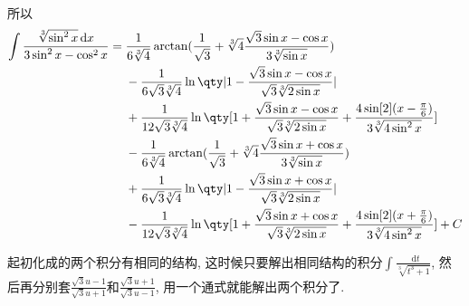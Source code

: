 \documentclass{ctexbook}
\newcommand*{\dif}{\mathop{}\!\mathrm{d}}
\begin{document}
{\begin{align*}
\end{align*} 
所以
\begin{align*}
\int\frac{\sqrt[3]{\sin^{2}{x}}\dif{x}}{3\sin^{2}{x}-\cos^{2}{x}}={}&\frac{1}{6\sqrt[3]{4}}\arctan(\frac{1}{\sqrt{3}}+\sqrt[3]{4}\frac{\sqrt{3}\sin{x}-\cos{x}}{3\sqrt[3]{\sin{x}}})\\
{}&-\frac{1}{6\sqrt{3}\sqrt[3]{4}}\ln\qty|1-\frac{\sqrt{3}\sin{x}-\cos{x}}{\sqrt{3}\sqrt[3]{2\sin{x}}}|\\
{}&+\frac{1}{12\sqrt{3}\sqrt[3]{4}}\ln\qty[1+\frac{\sqrt{3}\sin{x}-\cos{x}}{\sqrt{3}\sqrt[3]{2\sin{x}}}+\frac{4\sin[2](x-\frac{\pi}{6})}{3\sqrt[3]{4\sin^{2}{x}}}]\\
{}&-\frac{1}{6\sqrt[3]{4}}\arctan(\frac{1}{\sqrt{3}}+\sqrt[3]{4}\frac{\sqrt{3}\sin{x}+\cos{x}}{3\sqrt[3]{\sin{x}}})\\
{}&+\frac{1}{6\sqrt{3}\sqrt[3]{4}}\ln\qty|1-\frac{\sqrt{3}\sin{x}+\cos{x}}{\sqrt{3}\sqrt[3]{2\sin{x}}}|\\
{}&-\frac{1}{12\sqrt{3}\sqrt[3]{4}}\ln\qty[1+\frac{\sqrt{3}\sin{x}+\cos{x}}{\sqrt{3}\sqrt[3]{2\sin{x}}}+\frac{4\sin[2](x+\frac{\pi}{6})}{3\sqrt[3]{4\sin^{2}{x}}}]+C
\end{align*}\par
{\kaishu 起初化成的两个积分有相同的结构, 这时候只要解出相同结构的积分$\int\frac{\dif{t}}{\sqrt[3]{t^{3}+1}}$, 然后再分别套$\frac{\sqrt{3}u-1}{\sqrt{3}u+1}$和$\frac{\sqrt{3}u+1}{\sqrt{3}u-1}$, 用一个通式就能解出两个积分了. \par}
}
\end{document}
